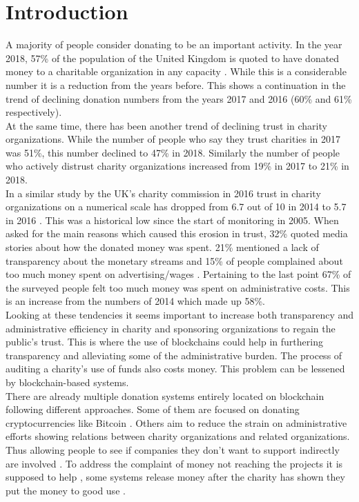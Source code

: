 \chapter{Introduction}
A majority of people consider donating to be an important activity. In the year 2018, 57\% of the population of the United Kingdom is quoted to have donated money to a charitable organization in any capacity \cite{giving19}. While this is a considerable number it is a reduction from the years before. This shows a continuation in the trend of declining donation numbers from the years 2017 and 2016 (60\% and 61\% respectively)\cite{giving19}. %
\\
At the same time, there has been another trend of declining trust in charity organizations. While the number of people who say they trust charities in 2017 was 51\%, this number declined to 47\% in 2018. Similarly the number of people who actively distrust charity organizations increased from 19\% in 2017 to 21\% in 2018\cite{giving19}.\\
In a similar study by the UK's charity commission in 2016 trust in charity organizations on a numerical scale has dropped from 6.7 out of 10 in 2014 to 5.7 in 2016 \cite{trustgov}. This was a historical low since the start of monitoring in 2005. When asked for the main reasons which caused this erosion in trust, 32\% quoted media stories about how the donated money was spent. 21\% mentioned a lack of transparency about the monetary streams and 15\% of people complained about too much money spent on advertising/wages \cite{trustgov}. Pertaining to the last point 67\% of the surveyed people felt too much money was spent on administrative costs. This is an increase from the numbers of 2014 which made up 58\%.\\
Looking at these tendencies it seems important to increase both transparency and administrative efficiency in charity and sponsoring organizations to regain the public's trust. This is where the use of blockchains could help in furthering transparency and alleviating some of the administrative burden. The process of auditing a charity's use of funds also costs money. This problem can be lessened by blockchain-based systems. %
\\
There are already multiple donation systems entirely located on blockchain following different approaches. Some of them are focused on donating cryptocurrencies like Bitcoin \cite{bitgive}\cite{binance}. Others aim to reduce the strain on administrative efforts showing relations between charity organizations and related organizations. Thus allowing people to see if companies they don't want to support indirectly are involved \cite{disberse}. To address the complaint of money not reaching the projects it is supposed to help \cite{trustgov}, some systems release money after the charity has shown they put the money to good use \cite{alice}\cite{promisegive}.\\
